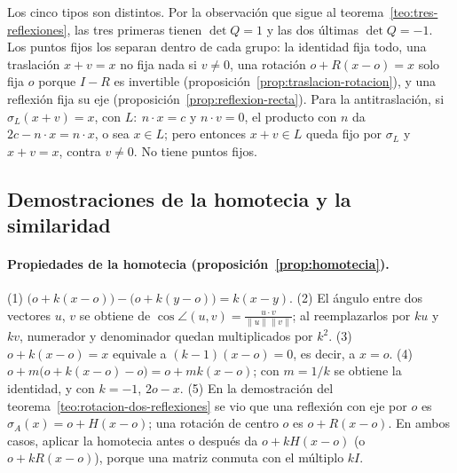 \begin{demostracion}
Los cinco tipos son distintos. Por la observación que sigue al teorema~\ref{teo:tres-reflexiones}, las tres primeras tienen
\(\det Q=1\) y las dos últimas \(\det Q=-1\). Los puntos fijos los separan dentro de cada
grupo: la identidad fija todo, una traslación \(x+v=x\) no fija nada si \(v\neq0\), una
rotación \(o+R(x-o)=x\) solo fija \(o\) porque \(I-R\) es invertible
(proposición~\ref{prop:traslacion-rotacion}), y una reflexión fija su eje
(proposición~\ref{prop:reflexion-recta}). Para la antitraslación, si \(\sigma_{L}(x+v)=x\), con
\(L:\ n\cdot x=c\) y \(n\cdot v=0\), el producto con \(n\) da \(2c-n\cdot x=n\cdot x\), o sea
\(x\in L\); pero entonces \(x+v\in L\) queda fijo por \(\sigma_{L}\) y \(x+v=x\), contra
\(v\neq0\). No tiene puntos fijos.
\end{demostracion}

\subsection{Demostraciones de la homotecia y la similaridad}\label{sec:demos-similaridades}

\paragraph{Propiedades de la homotecia (proposición~\ref{prop:homotecia}).}
\begin{demostracion}
(1) \(\bigl(o+k(x-o)\bigr)-\bigl(o+k(y-o)\bigr)=k(x-y)\). (2) El ángulo entre dos vectores
\(u\), \(v\) se obtiene de \(\cos\angle(u,v)=\frac{u\cdot v}{\lVert u\rVert\lVert v\rVert}\);
al reemplazarlos por \(ku\) y \(kv\), numerador y denominador quedan multiplicados por
\(k^2\). (3) \(o+k(x-o)=x\) equivale a \((k-1)(x-o)=0\), es decir, a \(x=o\). (4)
\(o+m\bigl(o+k(x-o)-o\bigr)=o+mk(x-o)\); con \(m=1/k\) se obtiene la identidad, y con
\(k=-1\), \(2o-x\). (5) En la demostración del teorema~\ref{teo:rotacion-dos-reflexiones} se
vio que una reflexión con eje por \(o\) es \(\sigma_{A}(x)=o+H(x-o)\); una rotación de centro
\(o\) es \(o+R(x-o)\). En ambos casos, aplicar la homotecia antes o después da
\(o+kH(x-o)\) (o \(o+kR(x-o)\)), porque una matriz conmuta con el múltiplo \(kI\).
\end{demostracion}

